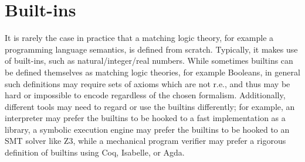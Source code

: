 \documentclass[UTF8,11pt]{article}
\theoremstyle{plain}
\theoremstyle{definition}
\theoremstyle{remark}
\newcommand{\parametric}[2]{{#1}\raisebox{.2ex}{\texttt{\footnotesize{\{}}}#2\raisebox{.2ex}{\texttt{\footnotesize{\}}}}}
\newcommand{\inj}[2]{\parametric{\mathit{inj}}{#1, #2}}
\begin{document}
%
%
%


\section{Built-ins}
\label{sec:builtins}

It is rarely the case in practice that a matching logic theory, for example
a programming language semantics, is defined from scratch.
Typically, it makes use of built-ins, such as natural/integer/real numbers.
While sometimes builtins can be defined themselves as matching logic theories,
for example Booleans, in general such definitions may require sets of axioms
which are not r.e., and thus may be hard or impossible to encode regardless
of the chosen formalism.
Additionally, different tools may need to regard or use the builtins
differently;
for example, an interpreter may prefer the builtins to be hooked to a
fast implementation as a library, a symbolic execution engine may prefer the
builtins to be hooked to an SMT solver like Z3, while a mechanical program
verifier may prefer a rigorous definition of builtins using Coq, Isabelle,
or Agda.
\end{document}
